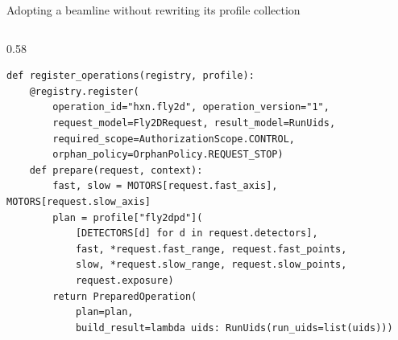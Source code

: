\begin{frame}[fragile]{Adopting a beamline without rewriting its profile collection}
\begin{columns}[T]
\begin{column}{0.58\textwidth}
\begin{lstlisting}[style=python, aboveskip=0pt, belowskip=0pt, breaklines=false]
def register_operations(registry, profile):
    @registry.register(
        operation_id="hxn.fly2d", operation_version="1",
        request_model=Fly2DRequest, result_model=RunUids,
        required_scope=AuthorizationScope.CONTROL,
        orphan_policy=OrphanPolicy.REQUEST_STOP)
    def prepare(request, context):
        fast, slow = MOTORS[request.fast_axis], MOTORS[request.slow_axis]
        plan = profile["fly2dpd"](
            [DETECTORS[d] for d in request.detectors],
            fast, *request.fast_range, request.fast_points,
            slow, *request.slow_range, request.slow_points,
            request.exposure)
        return PreparedOperation(
            plan=plan,
            build_result=lambda uids: RunUids(run_uids=list(uids)))
\end{lstlisting}
        \end{column}
    \end{columns}
\end{frame}

